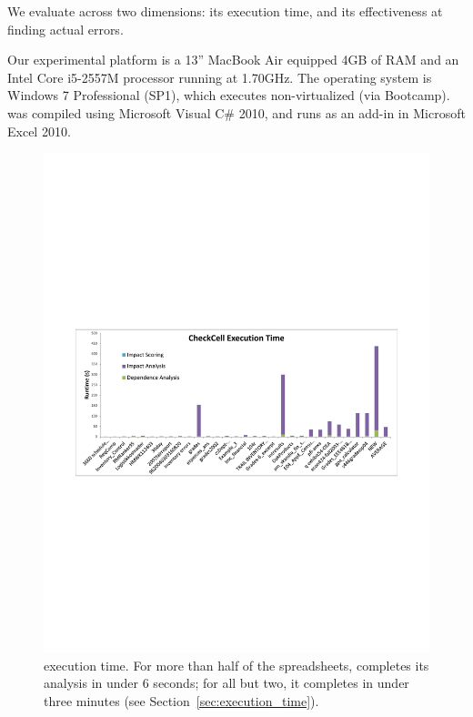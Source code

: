 We evaluate \checkcell{} across two dimensions: its execution time,
and its effectiveness at finding actual errors.

Our experimental platform is a 13'' MacBook Air equipped 4GB of RAM
and an Intel Core i5-2557M processor running at 1.70GHz. The operating
system is Windows 7 Professional (SP1), which executes non-virtualized
(via Bootcamp). \checkcell{} was compiled using Microsoft Visual C\#
2010, and runs as an add-in in Microsoft Excel 2010.

\begin{figure}[!t]
\centering
\includegraphics[width=6.5in]{execution_time_graph}
  \caption{\checkcell{} execution time. For more than half of the spreadsheets, \checkcell{} completes its analysis in under 6 seconds; for all but two, it completes in under three minutes (see Section~\ref{sec:execution_time}).\label{fig:execution_time_graph}}
\end{figure}

